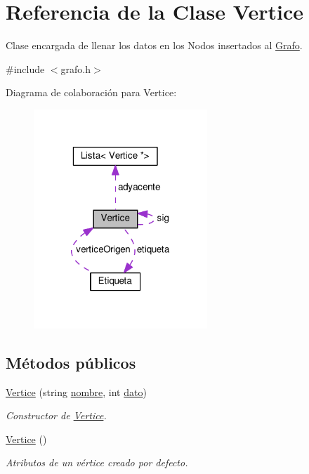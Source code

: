\hypertarget{classVertice}{}\section{Referencia de la Clase Vertice}
\label{classVertice}


Clase encargada de llenar los datos en los Nodos insertados al \hyperlink{classGrafo}{Grafo}.  




{\ttfamily \#include $<$grafo.\+h$>$}



Diagrama de colaboración para Vertice\+:\nopagebreak
\begin{figure}[H]
\begin{center}
\leavevmode
\includegraphics[width=185pt]{classVertice__coll__graph}
\end{center}
\end{figure}
\subsection*{Métodos públicos}
\begin{DoxyCompactItemize}
\item 
\hyperlink{classVertice_a7aff8f5bebd64a371708d72e12edc1dd}{Vertice} (string \hyperlink{classVertice_ab23a005b5c7802792ec2277227ba4d83}{nombre}, int \hyperlink{classVertice_accb96991da9db4ee82280acf2019d1dc}{dato})
\begin{DoxyCompactList}\small\item\em Constructor de \hyperlink{classVertice}{Vertice}. \end{DoxyCompactList}\item 
\mbox{\label{classVertice_a9dd7cf987cddf248b9d4e3d31bf8822b}} 
\hyperlink{classVertice_a9dd7cf987cddf248b9d4e3d31bf8822b}{Vertice} ()
\begin{DoxyCompactList}\small\item\em Atributos de un vértice creado por defecto. \end{DoxyCompactList}\end{DoxyCompactItemize}
